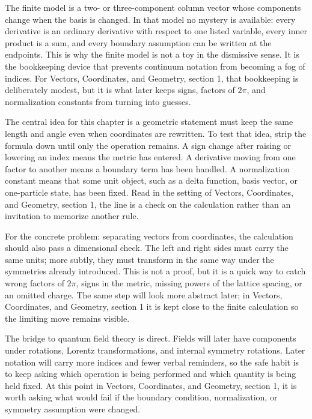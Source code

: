 The finite model is a two- or three-component column vector whose components change when the basis is changed.  In that model no mystery is available: every derivative is an ordinary derivative with respect to one listed variable, every inner product is a sum, and every boundary assumption can be written at the endpoints.  This is why the finite model is not a toy in the dismissive sense.  It is the bookkeeping device that prevents continuum notation from becoming a fog of indices.  For Vectors, Coordinates, and Geometry, section 1, that bookkeeping is deliberately modest, but it is what later keeps signs, factors of \(2\pi\), and normalization constants from turning into guesses.

The central idea for this chapter is a geometric statement must keep the same length and angle even when coordinates are rewritten.  To test that idea, strip the formula down until only the operation remains.  A sign change after raising or lowering an index means the metric has entered.  A derivative moving from one factor to another means a boundary term has been handled.  A normalization constant means that some unit object, such as a delta function, basis vector, or one-particle state, has been fixed.  Read in the setting of Vectors, Coordinates, and Geometry, section 1, the line is a check on the calculation rather than an invitation to memorize another rule.

For the concrete problem: separating vectors from coordinates, the calculation should also pass a dimensional check.  The left and right sides must carry the same units; more subtly, they must transform in the same way under the symmetries already introduced.  This is not a proof, but it is a quick way to catch wrong factors of \(2\pi\), signs in the metric, missing powers of the lattice spacing, or an omitted charge.  The same step will look more abstract later; in Vectors, Coordinates, and Geometry, section 1 it is kept close to the finite calculation so the limiting move remains visible.

The bridge to quantum field theory is direct.  Fields will later have components under rotations, Lorentz transformations, and internal symmetry rotations.  Later notation will carry more indices and fewer verbal reminders, so the safe habit is to keep asking which operation is being performed and which quantity is being held fixed.  At this point in Vectors, Coordinates, and Geometry, section 1, it is worth asking what would fail if the boundary condition, normalization, or symmetry assumption were changed.

